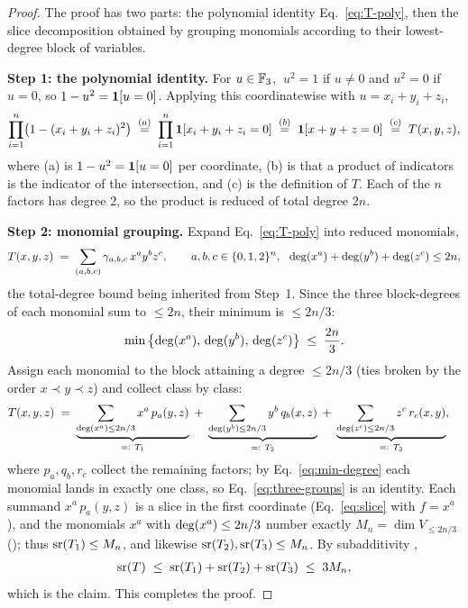 \begin{proof}
The proof has two parts: the polynomial identity Eq.~\eqref{eq:T-poly}, then the slice
decomposition obtained by grouping monomials according to their lowest-degree block
of variables.

\smallskip\noindent
\textbf{Step 1: the polynomial identity.}
For $u\in\mathbb{F}_3$, $\ u^2=1$ if $u\ne 0$ and $u^2=0$ if $u=0$, so $1-u^2=\mathbf{1}[u=0]$.
Applying this coordinatewise with $u=x_i+y_i+z_i$,
\begin{align*}
\prod_{i=1}^{n}\bigl(1-(x_i+y_i+z_i)^2\bigr)
\;\overset{(a)}{=}\;\prod_{i=1}^{n}\mathbf{1}[x_i+y_i+z_i=0]
\;\overset{(b)}{=}\;\mathbf{1}[x+y+z=0]
\;\overset{(c)}{=}\;T(x,y,z),
\end{align*}
where (a) is $1-u^2=\mathbf{1}[u=0]$ per coordinate, (b) is that a product of indicators is
the indicator of the intersection, and (c) is the definition of $T$. Each of the $n$
factors has degree $2$, so the product is reduced of total degree $2n$.

\smallskip\noindent
\textbf{Step 2: monomial grouping.}
Expand Eq.~\eqref{eq:T-poly} into reduced monomials,
\begin{align}\label{eq:T-expand}
T(x,y,z)\;=\;\sum_{(a,b,c)}\gamma_{a,b,c}\,x^a y^b z^c,
\qquad a,b,c\in\{0,1,2\}^n,\ \ \operatorname{deg}(x^a)+\operatorname{deg}(y^b)+\operatorname{deg}(z^c)\le 2n,
\end{align}
the total-degree bound being inherited from Step~1. Since the three block-degrees of
each monomial sum to $\le 2n$, their minimum is $\le 2n/3$:
\begin{align}\label{eq:min-degree}
\min\left\{ \operatorname{deg}(x^a),\,\operatorname{deg}(y^b),\,\operatorname{deg}(z^c) \right\}\;\le\;\frac{2n}{3}.
\end{align}
Assign each monomial to the block attaining a degree $\le 2n/3$ (ties broken by the
order $x\prec y\prec z$) and collect class by class:
\begin{align}\label{eq:three-groups}
T(x,y,z)
&\;=\;\underbrace{\sum_{\operatorname{deg}(x^a)\le 2n/3}x^a\,p_a(y,z)}_{=:~T_1}
\;+\;\underbrace{\sum_{\operatorname{deg}(y^b)\le 2n/3}y^b\,q_b(x,z)}_{=:~T_2}
\;+\;\underbrace{\sum_{\operatorname{deg}(z^c)\le 2n/3}z^c\,r_c(x,y)}_{=:~T_3},
\end{align}
where $p_a,q_b,r_c$ collect the remaining factors; by Eq.~\eqref{eq:min-degree} each
monomial lands in exactly one class, so Eq.~\eqref{eq:three-groups} is an identity.
Each summand $x^a\,p_a(y,z)$ is a slice in the first coordinate (Eq.~\eqref{eq:slice}
with $f=x^a$), and the monomials $x^a$ with $\operatorname{deg}(x^a)\le 2n/3$ number exactly
$M_n=\dim V_{\le 2n/3}$ (); thus $\operatorname{sr}(T_1)\le M_n$, and
likewise $\operatorname{sr}(T_2),\operatorname{sr}(T_3)\le M_n$. By subadditivity ,
\begin{align*}
\operatorname{sr}(T)\;\le\;\operatorname{sr}(T_1)+\operatorname{sr}(T_2)+\operatorname{sr}(T_3)\;\le\;3M_n,
\end{align*}
which is the claim. This completes the proof.
\end{proof}

